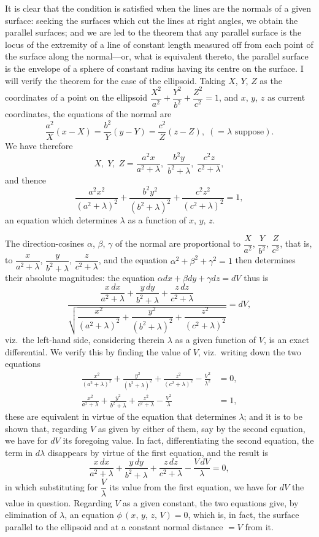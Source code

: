 \documentclass[11pt,a4paper]{book}
\begin{document}
\noindent
It is clear that the condition is satisfied when the lines are the normals of a given surface: seeking the surfaces which cut the lines at right angles, we obtain the parallel surfaces; and we are led to the theorem that any parallel surface is the locus of the extremity of a line of constant length measured off from each point of the surface along the normal---or, what is equivalent thereto, the parallel surface is the envelope of a sphere of constant radius having its centre on the surface. I will verify the theorem for the case of the ellipsoid. Taking $X$, $Y$, $Z$ as the coordinates of a point on the ellipsoid $\dfrac{X^2}{a^2} + \dfrac{Y^2}{b^2} + \dfrac{Z^2}{c^2} = 1$, and $x$, $y$, $z$ as current coordinates, the equations of the normal are
\[
\frac{a^2}{X}(x-X) = \frac{b^2}{Y}(y-Y) = \frac{c^2}{Z}(z-Z),\; (= \lambda \text{ suppose}).
\]
We have therefore
\[
X,\; Y,\; Z = \frac{a^2x}{a^2+\lambda},\; \frac{b^2y}{b^2+\lambda},\; \frac{c^2z}{c^2+\lambda},
\]
and thence
\[
\frac{a^2x^2}{(a^2+\lambda)^2} + \frac{b^2y^2}{(b^2+\lambda)^2} + \frac{c^2z^2}{(c^2+\lambda)^2} = 1,
\]
an equation which determines $\lambda$ as a function of $x$, $y$, $z$.

The direction-cosines $\alpha$, $\beta$, $\gamma$ of the normal are proportional to $\dfrac{X}{a^2}$, $\dfrac{Y}{b^2}$, $\dfrac{Z}{c^2}$, that is, to $\dfrac{x}{a^2+\lambda}$, $\dfrac{y}{b^2+\lambda}$, $\dfrac{z}{c^2+\lambda}$, and the equation $\alpha^2+\beta^2+\gamma^2=1$ then determines their absolute magnitudes: the equation $\alpha dx + \beta dy + \gamma dz = dV$ thus is
\[
\frac{\dfrac{x\,dx}{a^2+\lambda} + \dfrac{y\,dy}{b^2+\lambda} + \dfrac{z\,dz}{c^2+\lambda}}{\sqrt{\dfrac{x^2}{(a^2+\lambda)^2} + \dfrac{y^2}{(b^2+\lambda)^2} + \dfrac{z^2}{(c^2+\lambda)^2}}} = dV,
\]
viz.\ the left-hand side, considering therein $\lambda$ as a given function of $V$, is an exact differential. We verify this by finding the value of $V$, viz.\ writing down the two equations
\begin{align*}
\frac{x^2}{(a^2+\lambda)^2} + \frac{y^2}{(b^2+\lambda)^2} + \frac{z^2}{(c^2+\lambda)^2} - \frac{V^2}{\lambda^2} &= 0, \\
\frac{x^2}{a^2+\lambda} + \frac{y^2}{b^2+\lambda} + \frac{z^2}{c^2+\lambda} - \frac{V^2}{\lambda} &= 1,
\end{align*}
these are equivalent in virtue of the equation that determines $\lambda$; and it is to be shown that, regarding $V$ as given by either of them, say by the second equation, we have for $dV$ its foregoing value. In fact, differentiating the second equation, the term in $d\lambda$ disappears by virtue of the first equation, and the result is
\[
\frac{x\,dx}{a^2+\lambda} + \frac{y\,dy}{b^2+\lambda} + \frac{z\,dz}{c^2+\lambda} - \frac{V\,dV}{\lambda} = 0,
\]
in which substituting for $\dfrac{V}{\lambda}$ its value from the first equation, we have for $dV$ the value in question. Regarding $V$ as a given constant, the two equations give, by elimination of $\lambda$, an equation $\phi\,(x,\,y,\,z,\,V) = 0$, which is, in fact, the surface parallel to the ellipsoid and at a constant normal distance $= V$ from it.
\end{document}
